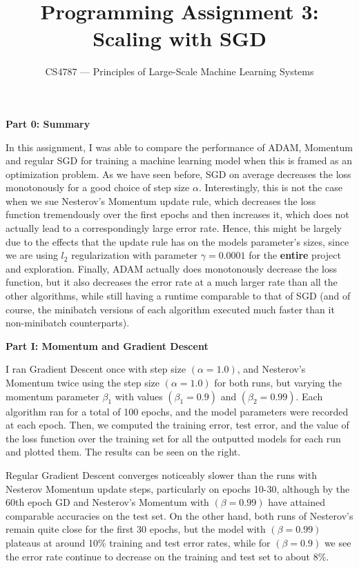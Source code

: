 \documentclass[10pt]{article}
\begin{document}
\nobibliography*

\title{Programming Assignment 3: Scaling with SGD}
\author{CS4787 --- Principles of Large-Scale Machine Learning Systems}
\date{}

\maketitle
\begin{multicols}{2} 
\noindent
\textbf{Part 0: Summary} \par
In this assignment, I was able to compare the performance of ADAM, Momentum and regular SGD for training a machine learning model when this is framed as an optimization problem. As we have seen before, SGD on average decreases the loss monotonously for a good choice of step size $\alpha$. Interestingly, this is not the case when we sue Nesterov's Momentum update rule, which decreases the loss function tremendously over the first epochs and then increases it, which does not actually lead to a correspondingly large error rate. Hence, this might be largely due to the effects that the update rule has on the models parameter's sizes, since we are using $l_2$ regularization with parameter $\gamma= 0.0001$ for the \textbf{entire} project and exploration. Finally, ADAM actually does monotonously decrease the loss function, but it also decreases the error rate at a much larger rate than all the other algorithms, while still having a runtime comparable to that of SGD (and of course, the minibatch versions of each algorithm executed much faster than it non-minibatch counterparts).\par 
\noindent
\textbf{Part I: Momentum and Gradient Descent}\par 
I ran Gradient Descent once with step size $(\alpha = 1.0)$, and Nesterov's Momentum twice using the step size $(\alpha = 1.0)$ for both runs, but varying the momentum parameter $\beta_1$ with values $(\beta_1=0.9)$ and $(\beta_2 = 0.99)$. Each algorithm ran for a total of 100 epochs, and the model parameters were recorded at each epoch. Then, we computed the training error, test error, and the value of the loss function over the training set for all the outputted models for each run and plotted them. The results can be seen on the right. \par
Regular Gradient Descent converges noticeably slower than the runs with Nesterov Momentum update steps, particularly on epochs 10-30, although by the 60th epoch GD and Nesterov's Momentum with $(\beta=0.99)$ have attained comparable accuracies on the test set. On the other hand, both runs of Nesterov's remain quite close for the first 30 epochs, but the model with $(\beta=0.99)$ plateaus at around 10\% training and test error rates, while for $(\beta=0.9)$ we see the error rate continue to decrease on the training and test set to about 8\%.\par 

\end{multicols}
\end{document}
